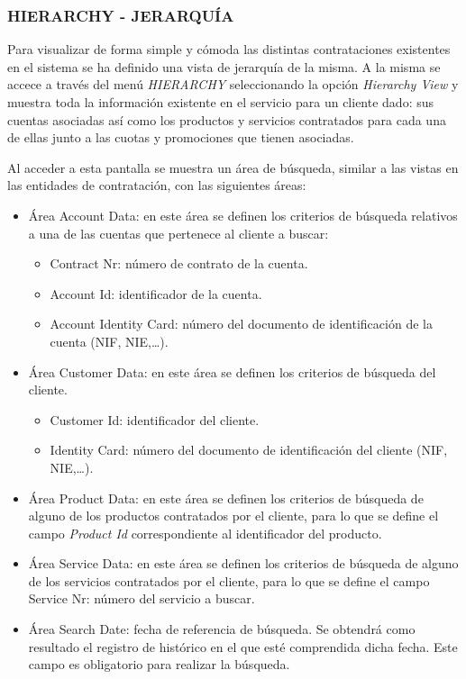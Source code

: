\subsubsection{HIERARCHY - JERARQUÍA}

Para visualizar de forma simple y cómoda las distintas contrataciones existentes en el sistema se ha definido una vista de jerarquía de la misma. A la misma se accece a través del menú \emph{HIERARCHY} seleccionando la opción \emph{Hierarchy View} y muestra toda la información existente en el servicio para un cliente dado: sus cuentas asociadas así como los productos y servicios contratados para cada una de ellas junto a las cuotas y promociones que tienen asociadas.

Al acceder a esta pantalla se muestra un área de búsqueda, similar a las vistas en las entidades de contratación, con las siguientes áreas:
\begin{itemize}
	\item Área Account Data: en este área se definen los criterios de búsqueda relativos a una de las cuentas que pertenece al cliente a buscar:
		\begin{itemize}
			\item Contract Nr: número de contrato de la cuenta.
			\item Account Id: identificador de la cuenta.
			\item Account Identity Card: número del documento de identificación de la cuenta (NIF, NIE,\dots).
		\end{itemize}
	\item Área Customer Data: en este área se definen los criterios de búsqueda del cliente.
		\begin{itemize}
			\item Customer Id: identificador del cliente.
			\item Identity Card: número del documento de identificación del cliente (NIF, NIE,\dots).
		\end{itemize}
	\item Área Product Data: en este área se definen los criterios de búsqueda de alguno de los productos contratados por el cliente, para lo que se define el campo \emph{Product Id} correspondiente al identificador del producto.
	\item Área Service Data: en este área se definen los criterios de búsqueda de alguno de los servicios contratados por el cliente, para lo que se define el campo Service Nr: número del servicio a buscar.
	\item Área Search Date: fecha de referencia de búsqueda. Se obtendrá como resultado el registro de histórico en el que esté comprendida dicha fecha. Este campo es obligatorio para realizar la búsqueda.
\end{itemize}

